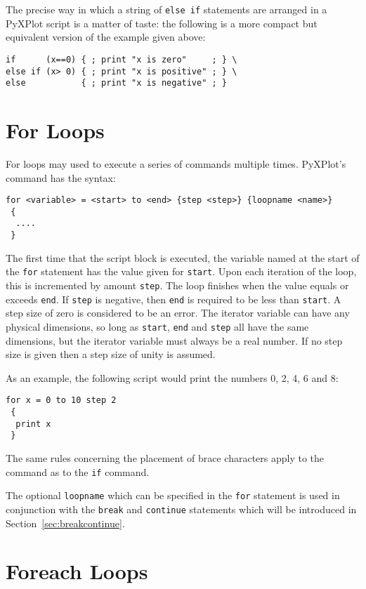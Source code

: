 The precise way in which a string of {\tt else if} statements are arranged in a
PyXPlot script is a matter of taste: the following is a more compact but
equivalent version of the example given above:

\begin{verbatim}
if      (x==0) { ; print "x is zero"     ; } \
else if (x> 0) { ; print "x is positive" ; } \
else           { ; print "x is negative" ; }
\end{verbatim}

\section{For Loops}

For loops may used to execute a series of commands multiple times. PyXPlot's
 command has the syntax:

\begin{verbatim}
for <variable> = <start> to <end> {step <step>} {loopname <name>}
 {
  ....
 }
\end{verbatim}

\noindent The first time that the script block is executed, the variable named
at the start of the {\tt for} statement has the value given for {\tt start}.
Upon each iteration of the loop, this is incremented by amount {\tt step}. The
loop finishes when the value equals or exceeds {\tt end}. If {\tt step} is
negative, then {\tt end} is required to be less than {\tt start}. A step size
of zero is considered to be an error.  The iterator variable can have any
physical dimensions, so long as {\tt start}, {\tt end} and {\tt step} all have
the same dimensions, but the iterator variable must always be a real number. If
no step size is given then a step size of unity is assumed.

As an example, the following script would print the numbers 0, 2, 4, 6 and 8:

\begin{verbatim}
for x = 0 to 10 step 2
 {
  print x
 }
\end{verbatim}

The same rules concerning the placement of brace characters apply to the
 command as to the {\tt if} command.

The optional {\tt loopname} which can be specified in the {\tt for} statement
is used in conjunction with the {\tt break} and {\tt continue} statements which
will be introduced in Section~\ref{sec:breakcontinue}.

\section{Foreach Loops}

